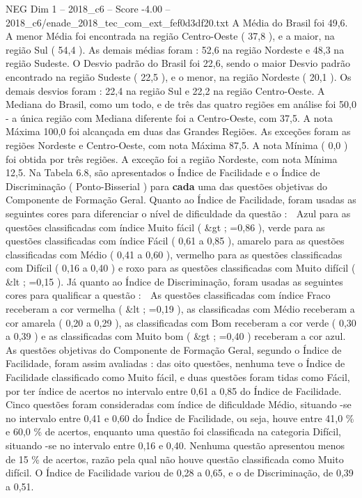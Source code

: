 \begin{textsample}{NEG Dim 1 – 2018\_c6 – Score -4.00 – 2018\_c6/enade\_2018\_tec\_com\_ext\_fef0d3df20.txt}
A Média do Brasil foi 49,6.
A menor Média foi encontrada na região Centro-Oeste ( 37,8 ), e a maior, na região Sul ( 54,4 ).
As demais médias foram : 52,6 na região Nordeste e 48,3 na região Sudeste.
O Desvio padrão do Brasil foi 22,6, sendo o maior Desvio padrão encontrado na região Sudeste ( 22,5 ), e o menor, na região Nordeste ( 20,1 ).
Os demais desvios foram : 22,4 na região Sul e 22,2 na região Centro-Oeste.
A Mediana do Brasil, como um todo, e de três das quatro regiões em análise foi 50,0 - a única região com Mediana diferente foi a Centro-Oeste, com 37,5.
A nota Máxima 100,0 foi alcançada em duas das Grandes Regiões.
As exceções foram as regiões Nordeste e Centro-Oeste, com nota Máxima 87,5.
A nota Mínima ( 0,0 ) foi obtida por três regiões.
A exceção foi a região Nordeste, com nota Mínima 12,5.
Na Tabela 6.8, são apresentados o Índice de Facilidade e o Índice de Discriminação ( Ponto-Bisserial ) para \textbf{cada} uma das questões objetivas do Componente de Formação Geral.
Quanto ao Índice de Facilidade, foram usadas as seguintes cores para diferenciar o nível de dificuldade da questão :  Azul para as questões classificadas com índice Muito fácil ( \&gt ; =0,86 ), verde para as questões classificadas com índice Fácil ( 0,61 a 0,85 ), amarelo para as questões classificadas com Médio ( 0,41 a 0,60 ), vermelho para as questões classificadas com Difícil ( 0,16 a 0,40 ) e roxo para as questões classificadas com Muito difícil ( \&lt ; =0,15 ).
Já quanto ao Índice de Discriminação, foram usadas as seguintes cores para qualificar a questão :  As questões classificadas com índice Fraco receberam a cor vermelha ( \&lt ; =0,19 ), as classificadas com Médio receberam a cor amarela ( 0,20 a 0,29 ), as classificadas com Bom receberam a cor verde ( 0,30 a 0,39 ) e as classificadas com Muito bom ( \&gt ; =0,40 ) receberam a cor azul.
As questões objetivas do Componente de Formação Geral, segundo o Índice de Facilidade, foram assim avaliadas : das oito questões, nenhuma teve o Índice de Facilidade classificado como Muito fácil, e duas questões foram tidas como Fácil, por ter índice de acertos no intervalo entre 0,61 a 0,85 do Índice de Facilidade.
Cinco questões foram consideradas com índice de dificuldade Médio, situando -se no intervalo entre 0,41 e 0,60 do Índice de Facilidade, ou seja, houve entre 41,0 \% e 60,0 \% de acertos, enquanto uma questão foi classificada na categoria Difícil, situando -se no intervalo entre 0,16 e 0,40.
Nenhuma questão apresentou menos de 15 \% de acertos, razão pela qual não houve questão classificada como Muito difícil.
O Índice de Facilidade variou de 0,28 a 0,65, e o de Discriminação, de 0,39 a 0,51.

\end{textsample}
